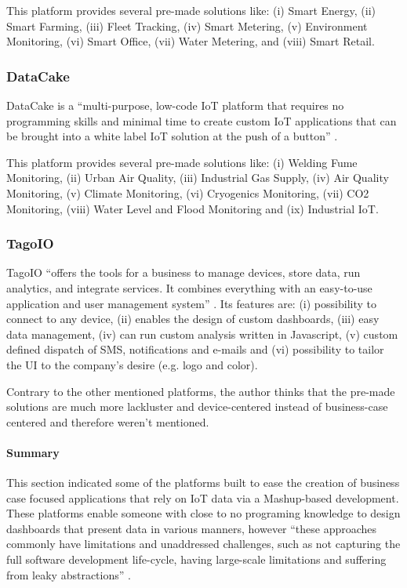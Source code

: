 This platform provides several pre-made solutions like: (i) Smart Energy, (ii) Smart Farming, (iii) Fleet Tracking, (iv) Smart Metering, (v) Environment Monitoring, (vi) Smart Office, (vii) Water Metering, and (viii) Smart Retail.

\subsubsection{DataCake}
\label{subsubsec:stateofart:arch:platforms:datacake}

DataCake is a ``multi-purpose, low-code \gls{IoT} platform that requires no programming skills and minimal time to create custom \gls{IoT} applications that can be brought into a white label \gls{IoT} solution at the push of a button'' \parencite{datacake}.

This platform provides several pre-made solutions like: (i) Welding Fume Monitoring, (ii) Urban Air Quality, (iii) Industrial Gas Supply, (iv) Air Quality Monitoring, (v) Climate Monitoring, (vi) Cryogenics Monitoring, (vii) CO2 Monitoring, (viii) Water Level and Flood Monitoring and (ix) Industrial \gls{IoT}.

\subsubsection{TagoIO}
\label{subsubsec:stateofart:arch:platforms:tagoio}

TagoIO ``offers the tools for a business to manage devices, store data, run analytics, and integrate services. It combines everything with an easy-to-use application and user management system'' \parencite{tagoio}. Its features are: (i) possibility to connect to any device, (ii) enables the design of custom dashboards, (iii) easy data management, (iv) can run custom analysis written in Javascript, (v) custom defined dispatch of SMS, notifications and e-mails and (vi) possibility to tailor the \gls{UI} to the company's desire (e.g. logo and color). 

Contrary to the other mentioned platforms, the author thinks that the pre-made solutions are much more lackluster and device-centered instead of business-case centered and therefore weren't mentioned.

\paragraph{Summary}
\label{subsubsec:stateofart:arch:platforms:summary}

This section indicated some of the platforms built to ease the creation of business case focused applications that rely on \gls{IoT} data via a Mashup-based development.
These platforms enable someone with close to no programing knowledge to design dashboards that present data in various manners, however ``these approaches commonly have limitations and unaddressed challenges, such as not capturing the full software development life-cycle, having large-scale limitations and suffering from leaky abstractions'' \parencite{DIAS2022100529}.


